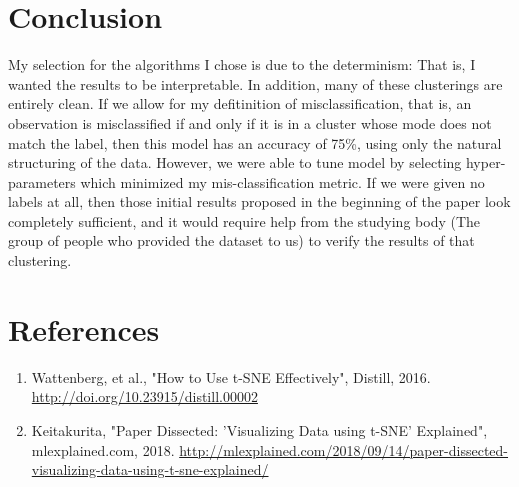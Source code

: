 \documentclass[20pt]{article} %
\begin{document}
\section{Conclusion}
My selection for the algorithms I chose is due to the determinism: That is, I wanted the results to be interpretable.  In addition, many of these clusterings are entirely clean.  If we allow for my defitinition of misclassification, that is, an observation is misclassified if and only if it is in a cluster whose mode does not match the label, then this model has an accuracy of 75\%, using only the natural structuring of the data.  However, we were able to tune model by selecting hyper-parameters which minimized my mis-classification metric.  If we were given no labels at all, then those initial results proposed in the beginning of the paper look completely sufficient, and it would require help from the studying body (The group of people who provided the dataset to us) to verify the results of that clustering.

\section{References}
\begin{enumerate}
\item Wattenberg, et al., "How to Use t-SNE Effectively", Distill, 2016. \url{http://doi.org/10.23915/distill.00002}
\item Keitakurita, "Paper Dissected: 'Visualizing Data using t-SNE' Explained", mlexplained.com, 2018. \url{http://mlexplained.com/2018/09/14/paper-dissected-visualizing-data-using-t-sne-explained/}
\end{enumerate}
\end{document}
